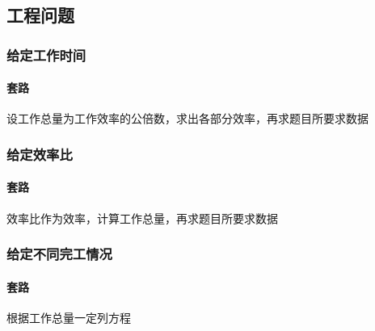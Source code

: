 \subsection{工程问题}

\subsubsection{给定工作时间}

\paragraph{套路} 设工作总量为工作效率的公倍数，求出各部分效率，再求题目所要求数据

\subsubsection{给定效率比}

\paragraph{套路} 效率比作为效率，计算工作总量，再求题目所要求数据

\subsubsection{给定不同完工情况}

\paragraph{套路} 根据工作总量一定列方程